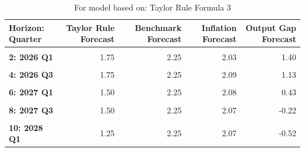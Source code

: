 \begin{table}
\centering
\caption{For model based on: Taylor Rule Formula 3}
\centering
\begin{tabular}[t]{>{}l|rrrr}
\toprule
Horizon: Quarter & Taylor Rule Forecast & Benchmark Forecast & Inflation Forecast & Output Gap Forecast\\
\midrule
\textbf{\cellcolor{gray!10}{1: 2025 Q4}} & \cellcolor{gray!10}{2.00} & \cellcolor{gray!10}{2.00} & \cellcolor{gray!10}{2.17} & \cellcolor{gray!10}{1.26}\\
\textbf{2: 2026 Q1} & 1.75 & 2.25 & 2.03 & 1.40\\
\textbf{\cellcolor{gray!10}{3: 2026 Q2}} & \cellcolor{gray!10}{1.75} & \cellcolor{gray!10}{2.25} & \cellcolor{gray!10}{2.10} & \cellcolor{gray!10}{1.35}\\
\textbf{4: 2026 Q3} & 1.75 & 2.25 & 2.09 & 1.13\\
\textbf{\cellcolor{gray!10}{5: 2026 Q4}} & \cellcolor{gray!10}{1.75} & \cellcolor{gray!10}{2.25} & \cellcolor{gray!10}{2.09} & \cellcolor{gray!10}{0.80}\\
\addlinespace
\textbf{6: 2027 Q1} & 1.50 & 2.25 & 2.08 & 0.43\\
\textbf{\cellcolor{gray!10}{7: 2027 Q2}} & \cellcolor{gray!10}{1.50} & \cellcolor{gray!10}{2.25} & \cellcolor{gray!10}{2.08} & \cellcolor{gray!10}{0.07}\\
\textbf{8: 2027 Q3} & 1.50 & 2.25 & 2.07 & -0.22\\
\textbf{\cellcolor{gray!10}{9: 2027 Q4}} & \cellcolor{gray!10}{1.50} & \cellcolor{gray!10}{2.25} & \cellcolor{gray!10}{2.07} & \cellcolor{gray!10}{-0.42}\\
\textbf{10: 2028 Q1} & 1.25 & 2.25 & 2.07 & -0.52\\
\bottomrule
\end{tabular}
\end{table}
